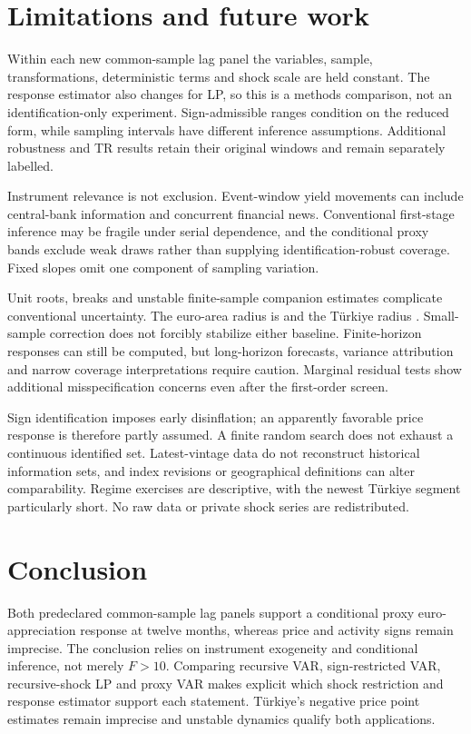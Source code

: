 \section{Limitations and future work}
Within each new common-sample lag panel the variables, sample, transformations, deterministic terms and shock scale are held constant. The response estimator also changes for LP, so this is a methods comparison, not an identification-only experiment. Sign-admissible ranges condition on the reduced form, while sampling intervals have different inference assumptions. Additional robustness and TR results retain their original windows and remain separately labelled.

Instrument relevance is not exclusion. Event-window yield movements can include central-bank information and concurrent financial news. Conventional first-stage inference may be fragile under serial dependence, and the conditional proxy bands exclude weak draws rather than supplying identification-robust coverage. Fixed slopes omit one component of sampling variation.

Unit roots, breaks and unstable finite-sample companion estimates complicate conventional uncertainty. The euro-area radius is \EARadius{} and the Türkiye radius \TRRadius{}. Small-sample correction does not forcibly stabilize either baseline. Finite-horizon responses can still be computed, but long-horizon forecasts, variance attribution and narrow coverage interpretations require caution. Marginal residual tests show additional misspecification concerns even after the first-order screen.

Sign identification imposes early disinflation; an apparently favorable price response is therefore partly assumed. A finite random search does not exhaust a continuous identified set. Latest-vintage data do not reconstruct historical information sets, and index revisions or geographical definitions can alter comparability. Regime exercises are descriptive, with the newest Türkiye segment particularly short. No raw data or private shock series are redistributed.
\section{Conclusion}
Both predeclared common-sample lag panels support a conditional proxy euro-appreciation response at twelve months, whereas price and activity signs remain imprecise. The conclusion relies on instrument exogeneity and conditional inference, not merely $F>10$. Comparing recursive VAR, sign-restricted VAR, recursive-shock LP and proxy VAR makes explicit which shock restriction and response estimator support each statement. Türkiye's negative price point estimates remain imprecise and unstable dynamics qualify both applications.

